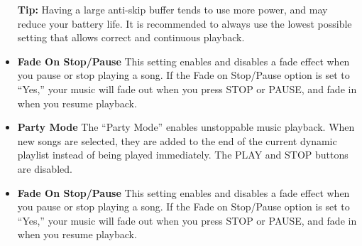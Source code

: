 \begin{itemize}

  \textbf{Tip:  }Having a large anti-skip buffer tends to use more power, and may reduce your battery life. It is recommended to always use the lowest possible setting that allows correct and continuous playback.

  \item \textbf{Fade On Stop/Pause}
    This setting enables and disables a fade effect when you pause or stop playing a song.  If the Fade on Stop/Pause option is set to ``Yes,'' your music will fade out when you press STOP or PAUSE, and fade in when you resume playback.

  \item \textbf{Party Mode}
    The ``Party Mode'' enables unstoppable music playback.  When new songs are selected, they are added to the end of the current dynamic playlist instead of being played immediately.  The PLAY and STOP buttons are disabled.

  \item \textbf{Fade On Stop/Pause}
    This setting enables and disables a fade effect when you pause or stop playing a song.  If the Fade on Stop/Pause option is set to ``Yes,'' your music will fade out when you press STOP or PAUSE, and fade in when you resume playback.


\end{itemize}
